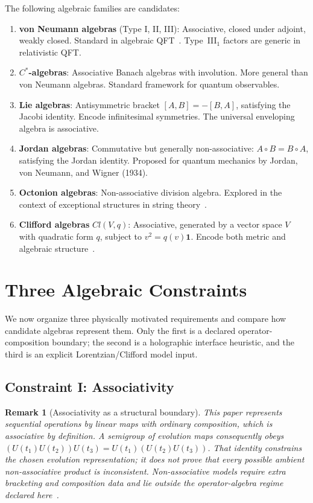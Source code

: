 \documentclass[12pt,a4paper,openany]{book}
\newtheorem{remark}[theorem]{Remark}
\begin{document}
The following algebraic families are candidates:

\begin{enumerate}
\item \textbf{von Neumann algebras} (Type I, II, III): Associative, closed under adjoint, weakly closed. Standard in algebraic QFT~\cite{Haag1996}. Type~III$_1$ factors are generic in relativistic QFT.
\item \textbf{$C^*$-algebras}: Associative Banach algebras with involution. More general than von Neumann algebras. Standard framework for quantum observables.
\item \textbf{Lie algebras}: Antisymmetric bracket $[A,B] = -[B,A]$, satisfying the Jacobi identity. Encode infinitesimal symmetries. The universal enveloping algebra is associative.
\item \textbf{Jordan algebras}: Commutative but generally non-associative: $A \circ B = B \circ A$, satisfying the Jordan identity. Proposed for quantum mechanics by Jordan, von Neumann, and Wigner (1934).
\item \textbf{Octonion algebras}: Non-associative division algebra. Explored in the context of exceptional structures in string theory~\cite{Gunaydin1973}.
\item \textbf{Clifford algebras} $Cl(V,q)$: Associative, generated by a vector space $V$ with quadratic form $q$, subject to $v^2 = q(v)\mathbf{1}$. Encode both metric and algebraic structure~\cite{Hestenes1966,Doran2003}.
\end{enumerate}

\section{Three Algebraic Constraints}
\label{Q-A-sec:constraints}

We now organize three physically motivated requirements and compare how candidate algebras represent them.  Only the first is a declared operator-composition boundary; the second is a holographic interface heuristic, and the third is an explicit Lorentzian/Clifford model input.

\subsection{Constraint I: Associativity}

\begin{remark}[Associativity as a structural boundary]
\label{Q-A-rem:assoc-boundary}
This paper represents sequential operations by linear maps with ordinary composition, which is associative by definition.  A semigroup of evolution maps consequently obeys
$(U(t_1)U(t_2))U(t_3)=U(t_1)(U(t_2)U(t_3))$.
That identity constrains the chosen evolution representation; it does not prove that every possible ambient non-associative product is inconsistent.  Non-associative models require extra bracketing and composition data and lie outside the operator-algebra regime declared here~\cite{Schafer1966,Gunaydin1973}.
\end{remark}
\end{document}
